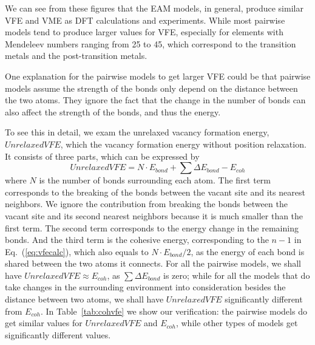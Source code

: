 \documentclass[%
 reprint,
 amsmath,amssymb,
 aps,
]{revtex4-1}
\begin{document}
We can see from these figures that the EAM models, in general, produce similar VFE and VME as DFT calculations and experiments.
While most pairwise models tend to produce larger values for VFE, especially for elements with Mendeleev numbers ranging from 25 to 45, which correspond to the transition metals and the post-transition metals.

One explanation for the pairwise models to get larger VFE could be that pairwise models assume the strength of the bonds only depend on the distance between the two atoms.
They ignore the fact that the change in the number of bonds can also affect the strength of the bonds, and thus the energy.

To see this in detail, we exam the unrelaxed vacancy formation energy, $\mathit{UnrelaxedVFE}$, which the vacancy formation energy without position relaxation.
It consists of three parts, which can be expressed by
\begin{equation}
\label{eq:vfedecomp}
\mathit{UnrelaxedVFE} = N\cdot E_{bond} + \sum\Delta E_{bond} - E_{coh}
\end{equation}
where $N$ is the number of bonds surrounding each atom.
The first term corresponds to the breaking of the bonds between the vacant site and its nearest neighbors.
We ignore the contribution from breaking the bonds between the vacant site and its second nearest neighbors because it is much smaller than the first term.
The second term corresponds to the energy change in the remaining bonds.
And the third term is the cohesive energy, corresponding to the $n-1$ in Eq.~(\ref{eq:vfecalc}), which also equals to $N\cdot E_{bond}/2$, as the energy of each bond is shared between the two atoms it connects.
For all the pairwise models, we shall have $\mathit{UnrelaxedVFE}\approx E_{coh}$, as $\sum\Delta E_{bond}$ is zero; while for all the models that do take changes in the surrounding environment into consideration besides the distance between two atoms, we shall have $\mathit{UnrelaxedVFE}$ significantly different from $E_{coh}$.
In Table~\ref{tab:cohvfe} we show our verification: the pairwise models do get similar values for $\mathit{UnrelaxedVFE}$ and $E_{coh}$, while other types of models get significantly different values.
\end{document}
